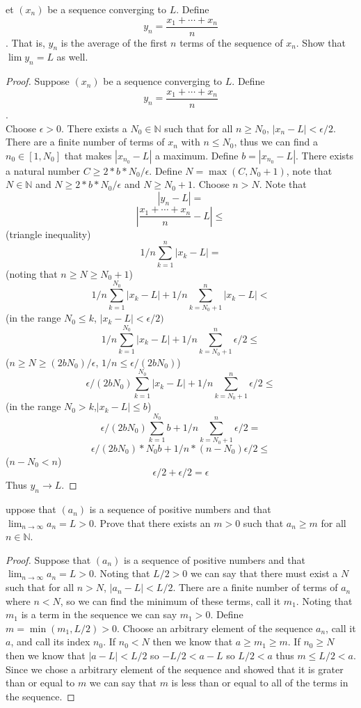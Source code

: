 \documentclass[12pt]{article}
\makeatletter
\theoremstyle{homework}
\newenvironment{exercise}[1]
{\def\@currentlabel{#1}\exercisecore}
{\endexercisecore}
\makeatother
\begin{document}
\begin{exercise}

Let $(x_n)$ be a sequence converging to $L$. Define $$y_n =\frac{x_1 + \cdots + x_n}{n}$$.
That is, $y_n$ is the average of the first $n$ terms of the sequence of $x_n$. Show that $\lim y_n = L$ as well.
\end{exercise}
\begin{proof}
Suppose $(x_n)$ be a sequence converging to $L$. Define $$y_n =\frac{x_1 + \cdots + x_n}{n}$$.\\
Choose $\epsilon>0$.  There exists a $N_0\in \mathbb{N}$ such that for all $n\geq N_0$, $|x_n-L|<\epsilon/2$.  There are a finite number of terms of $x_n$ with $n\leq N_0$, thus we can find a $n_0\in [1,N_0]$ that makes $|x_{n_0}-L|$ a maximum.  Define $b=|x_{n_0}-L|$.  There exists a natural number $C\geq 2*b*N_0/\epsilon$.  Define $N=\max(C ,N_0+1)$, note that $N\in\mathbb{N}$ and $N\geq 2*b*N_0/\epsilon$ and $N\geq N_0+1$.  Choose $n>N$.  Note that 
$$|y_n-L|=$$
$$|\frac{x_1 + \cdots + x_n}{n}-L|\leq$$(triangle inequality) 
$$1/n\sum^{n}_{k=1}|x_k-L|=$$ (noting that $n\geq N\geq N_0+1$)
$$1/n\sum^{N_0}_{k=1}|x_k-L|+1/n\sum^{n}_{k=N_0+1}|x_k-L|<$$ (in the range $N_0\leq k$, $|x_k-L|<\epsilon/2)$
$$1/n\sum^{N_0}_{k=1}|x_k-L|+1/n\sum^{n}_{k=N_0+1}\epsilon/2\leq $$ ($n\geq N\geq (2bN_0)/\epsilon$, $1/n\leq \epsilon/(2bN_0)$)
$$\epsilon/(2bN_0) \sum^{N_0}_{k=1}|x_k-L|+1/n\sum^{n}_{k=N_0+1}\epsilon/2\leq$$
(in the range $N_0>k$,$|x_k-L|\leq b$)
$$\epsilon/(2bN_0) \sum^{N_0}_{k=1}b+1/n\sum^{n}_{k=N_0+1}\epsilon/2=$$
$$\epsilon/(2bN_0) *N_0b+1/n*(n-N_0)\epsilon/2\leq$$($n-N_0<n$)
$$\epsilon/2+\epsilon/2=\epsilon$$
Thus $y_n\rightarrow L$.
\end{proof}
\begin{exercise}

Suppose that $(a_n)$ is a sequence of positive numbers and that $\lim_{n\rightarrow \infty} a_n = L > 0$. Prove that there exists an $m > 0$ such that $a_n \geq m$ for all $n \in \mathbb{N}$.
\end{exercise}
\begin{proof}
Suppose that $(a_n)$ is a sequence of positive numbers and that $\lim_{n\rightarrow \infty} a_n = L > 0$.  Noting that $L/2>0$ we can say that there must exist a $N$ such that for all $n>N$, $|a_n-L|<L/2$.  There are a finite number of terms of $a_n$ where $n<N$, so we can find the minimum of these terms, call it $m_1$.  Noting that $m_1$ is a term in the sequence we can say $m_1>0$.  Define $m=\min(m_1,L/2)>0$.  Choose an arbitrary element of the sequence $a_n$, call it $a$, and call its index $n_0$.  If $n_0<N$ then we know that $a\geq m_1\geq m$.  If $n_0\geq N$ then we know that $|a-L|<L/2$ so $-L/2<a-L$ so $L/2<a$ thus $m\leq L/2<a$.  Since we chose a arbitrary element of the sequence and showed that it is grater than or equal to $m$ we can say that $m$ is less than or equal to all of the terms in the sequence. 
\end{proof}
\end{document}
